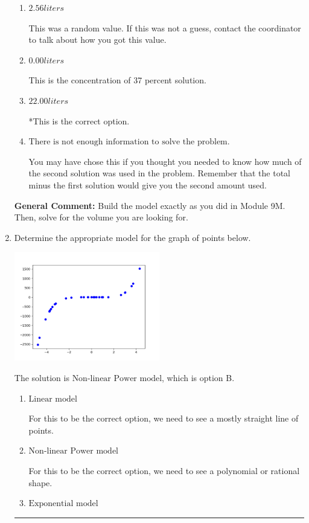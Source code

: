 \documentclass{extbook}[14pt]
\newcommand{\litem}[1]{\item #1

\rule{\textwidth}{0.4pt}}
\begin{document}
\begin{enumerate}
{\begin{enumerate}[label=\Alph*.]
This would be correct if Brittany used equal parts of each solution.
\item \( 2.56 liters \)

This was a random value. If this was not a guess, contact the coordinator to talk about how you got this value.
\item \( 0.00 liters \)

This is the concentration of 37 percent solution.
\item \( 22.00 liters \)

*This is the correct option.
\item \( \text{There is not enough information to solve the problem.} \)

You may have chose this if you thought you needed to know how much of the second solution was used in the problem. Remember that the total minus the first solution would give you the second amount used.
\end{enumerate}

\textbf{General Comment:} Build the model exactly as you did in Module 9M. Then, solve for the volume you are looking for.
}
\litem{
Determine the appropriate model for the graph of points below.

\begin{center}
    \includegraphics[width=0.5\textwidth]{../Figures/identifyModelGraph12CopyC.png}
\end{center}


The solution is \( \text{Non-linear Power model} \), which is option B.\begin{enumerate}[label=\Alph*.]
\item \( \text{Linear model} \)

For this to be the correct option, we need to see a mostly straight line of points.
\item \( \text{Non-linear Power model} \)

For this to be the correct option, we need to see a polynomial or rational shape.
\item \( \text{Exponential model} \)


\end{enumerate}}
\end{enumerate}
\end{document}
